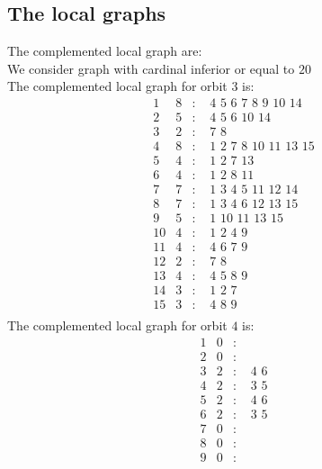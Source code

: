 \documentclass[12pt]{article}
\begin{document}
\subsection{The local graphs}
The complemented local graph are:\\
We consider graph with cardinal inferior or equal to $20$\\
The complemented local graph for orbit $3$ is:
\begin{equation*}
\begin{array}{rrcl}
1&8&:&\,\,4\,\,5\,\,6\,\,7\,\,8\,\,9\,\,10\,\,14\\
2&5&:&\,\,4\,\,5\,\,6\,\,10\,\,14\\
3&2&:&\,\,7\,\,8\\
4&8&:&\,\,1\,\,2\,\,7\,\,8\,\,10\,\,11\,\,13\,\,15\\
5&4&:&\,\,1\,\,2\,\,7\,\,13\\
6&4&:&\,\,1\,\,2\,\,8\,\,11\\
7&7&:&\,\,1\,\,3\,\,4\,\,5\,\,11\,\,12\,\,14\\
8&7&:&\,\,1\,\,3\,\,4\,\,6\,\,12\,\,13\,\,15\\
9&5&:&\,\,1\,\,10\,\,11\,\,13\,\,15\\
10&4&:&\,\,1\,\,2\,\,4\,\,9\\
11&4&:&\,\,4\,\,6\,\,7\,\,9\\
12&2&:&\,\,7\,\,8\\
13&4&:&\,\,4\,\,5\,\,8\,\,9\\
14&3&:&\,\,1\,\,2\,\,7\\
15&3&:&\,\,4\,\,8\,\,9\\
\end{array}
\end{equation*}
The complemented local graph for orbit $4$ is:
\begin{equation*}
\begin{array}{rrcl}
1&0&:&\\
2&0&:&\\
3&2&:&\,\,4\,\,6\\
4&2&:&\,\,3\,\,5\\
5&2&:&\,\,4\,\,6\\
6&2&:&\,\,3\,\,5\\
7&0&:&\\
8&0&:&\\
9&0&:&\\
\end{array}
\end{equation*}
\end{document}
